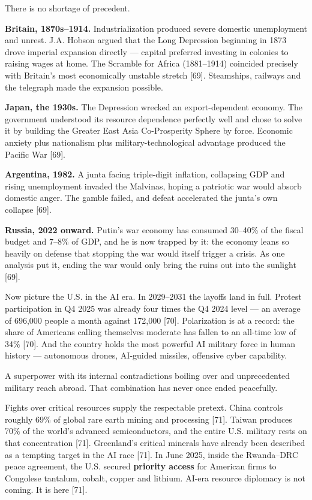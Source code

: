 \documentclass[11pt,a4paper]{article}
\begin{document}
There is no shortage of precedent.

\textbf{Britain, 1870s--1914.} Industrialization produced severe domestic unemployment and unrest. J.A. Hobson argued that the Long Depression beginning in 1873 drove imperial expansion directly --- capital preferred investing in colonies to raising wages at home. The Scramble for Africa (1881--1914) coincided precisely with Britain's most economically unstable stretch [69]. Steamships, railways and the telegraph made the expansion possible.

\textbf{Japan, the 1930s.} The Depression wrecked an export-dependent economy. The government understood its resource dependence perfectly well and chose to solve it by building the Greater East Asia Co-Prosperity Sphere by force. Economic anxiety plus nationalism plus military-technological advantage produced the Pacific War [69].

\textbf{Argentina, 1982.} A junta facing triple-digit inflation, collapsing GDP and rising unemployment invaded the Malvinas, hoping a patriotic war would absorb domestic anger. The gamble failed, and defeat accelerated the junta's own collapse [69].

\textbf{Russia, 2022 onward.} Putin's war economy has consumed 30--40\% of the fiscal budget and 7--8\% of GDP, and he is now trapped by it: the economy leans so heavily on defense that stopping the war would itself trigger a crisis. As one analysis put it, ending the war would only bring the ruins out into the sunlight [69].

Now picture the U.S. in the AI era. In 2029--2031 the layoffs land in full. Protest participation in Q4 2025 was already four times the Q4 2024 level --- an average of 696,000 people a month against 172,000 [70]. Polarization is at a record: the share of Americans calling themselves moderate has fallen to an all-time low of 34\% [70]. And the country holds the most powerful AI military force in human history --- autonomous drones, AI-guided missiles, offensive cyber capability.

A superpower with its internal contradictions boiling over and unprecedented military reach abroad. That combination has never once ended peacefully.

Fights over critical resources supply the respectable pretext. China controls roughly 69\% of global rare earth mining and processing [71]. Taiwan produces 70\% of the world's advanced semiconductors, and the entire U.S. military rests on that concentration [71]. Greenland's critical minerals have already been described as a tempting target in the AI race [71]. In June 2025, inside the Rwanda--DRC peace agreement, the U.S. secured \textbf{priority access} for American firms to Congolese tantalum, cobalt, copper and lithium. AI-era resource diplomacy is not coming. It is here [71].
\end{document}
